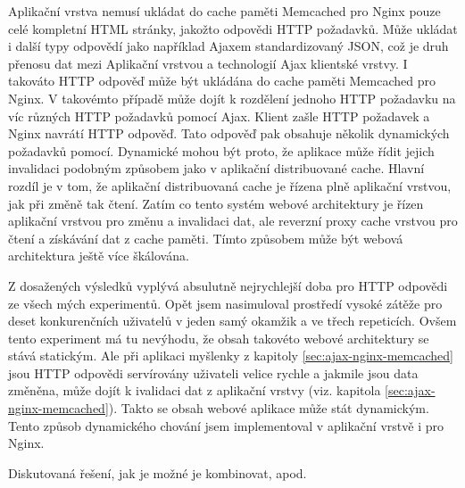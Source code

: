 \documentclass[12pt]{article}
\begin{document}
\obrazek
{}

\label{sec:ajax-nginx-memcached}
Aplikační vrstva nemusí ukládat do cache paměti Memcached pro Nginx pouze celé kompletní HTML stránky, jakožto odpovědi HTTP požadavků. Může ukládat i další typy odpovědí jako například Ajaxem standardizovaný JSON, což je druh přenosu dat mezi Aplikační vrstvou a technologií Ajax klientské vrstvy. I takováto HTTP odpověď může být ukládána do cache paměti Memcached pro Nginx. V takovémto případě může dojít k rozdělení jednoho HTTP požadavku na víc různých HTTP požadavků pomocí Ajax. Klient zašle HTTP požadavek a Nginx navrátí HTTP odpověď. Tato odpověď pak obsahuje několik dynamických požadavků pomocí. Dynamické mohou být proto, že aplikace může řídit jejich invalidaci podobným způsobem jako v aplikační distribuované cache. Hlavní rozdíl je v tom, že aplikační distribuovaná cache je řízena plně aplikační vrstvou, jak při změně tak čtení. Zatím co tento systém webové architektury je řízen aplikační vrstvou pro změnu a invalidaci dat, ale reverzní proxy cache vrstvou pro čtení a získávání dat z cache paměti. Tímto způsobem může být webová architektura ještě více škálována.

Z dosažených výsledků vyplývá absulutně nejrychlejší doba pro HTTP odpovědi ze všech mých experimentů. Opět jsem nasimuloval prostředí vysoké zátěže pro deset konkurenčních uživatelů v jeden samý okamžik a ve třech repeticích. Ovšem tento experiment má tu nevýhodu, že obsah takovéto webové architektury se stává statickým. Ale při aplikaci myšlenky z kapitoly \ref{sec:ajax-nginx-memcached} jsou HTTP odpovědi servírovány uživateli velice rychle a jakmile jsou data změněna, může dojít k ivalidaci dat z aplikační vrstvy (viz. kapitola \ref{sec:ajax-nginx-memcached}). Takto se obsah webové aplikace může stát dynamickým. Tento způsob dynamického chování jsem implementoval v aplikační vrstvě i pro Nginx.

\obrazek
{}

\obrazek
{}

Diskutovaná řešení, jak je možné je kombinovat, apod.
\end{document}

